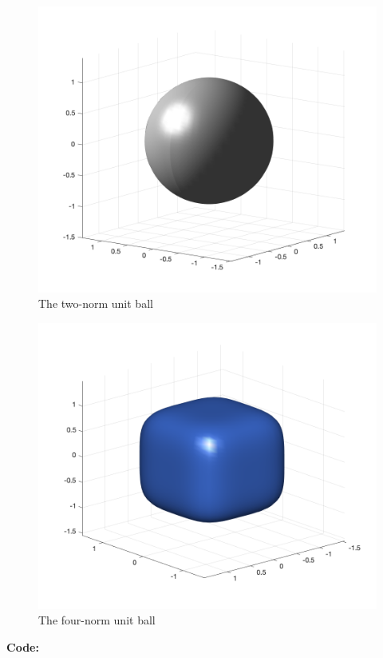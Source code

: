 \documentclass[12pt]{article}
\makeatletter
\theoremstyle{homework}
\newenvironment{exercise}[1]
{\def\@currentlabel{#1}\exercisecore}
{\endexercisecore}
\makeatother
\begin{document}
\begin{exercise}{P7}
\begin{figure}[H]
\begin{center}
    \end{center}
  \end{figure}
  \begin{figure}[H]
    \begin{center}
      \caption{The two-norm unit ball}
      \includegraphics[width=.76\textwidth]{2Norm.png}
    \end{center}
  \end{figure}
  \begin{figure}[H]
    \begin{center}
      \caption{The four-norm unit ball}
      \includegraphics[width=.76\textwidth]{4Norm.png}
    \end{center}
  \end{figure}
  \textbf{Code:}
  \begin{center}
    
  \end{center}
\end{exercise}
\end{document}

